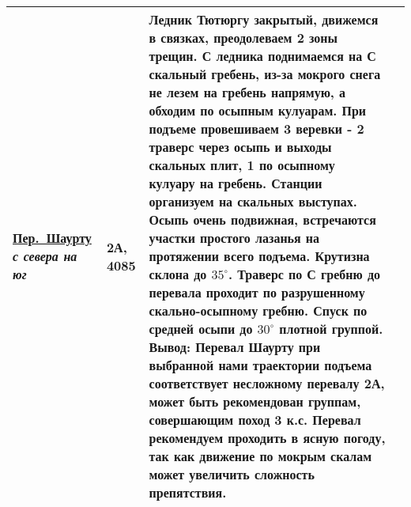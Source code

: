 {\begin{longtable}{|>{\centering\arraybackslash}m{3.8cm}|>{\centering\arraybackslash}m{1.3cm}|>{\raggedright\arraybackslash}m{11.5cm}|>{\centering\arraybackslash}m{1cm}|}
			\hyperref[subsec:Day12]{Пер.~Шаурту}																\newline\textit{с севера на юг}			&	2А,	4085					&	Ледник Тютюргу закрытый, движемся в связках, преодолеваем 2 зоны трещин. С ледника поднимаемся на С скальный гребень, из-за мокрого снега не лезем на гребень напрямую, а обходим по осыпным кулуарам. При подъеме провешиваем 3 веревки - 2 траверс через осыпь и выходы скальных плит, 1 по осыпному кулуару на гребень. Станции организуем на скальных выступах. Осыпь очень подвижная, встречаются участки простого лазанья на протяжении всего подъема. Крутизна склона до $35^\circ$. Траверс по С гребню до перевала проходит по разрушенному скально-осыпному гребню. Спуск по средней осыпи до $30^\circ$ плотной группой. \newline \textbf{Вывод:} Перевал Шаурту при выбранной нами траектории подъема соответствует несложному перевалу 2А, может быть рекомендован группам, совершающим поход 3 к.с. Перевал рекомендуем проходить в ясную погоду, так как движение по мокрым скалам может увеличить сложность препятствия.																																																																																																																																																																																																																																																																															&			\\ \hline

\end{longtable}}
